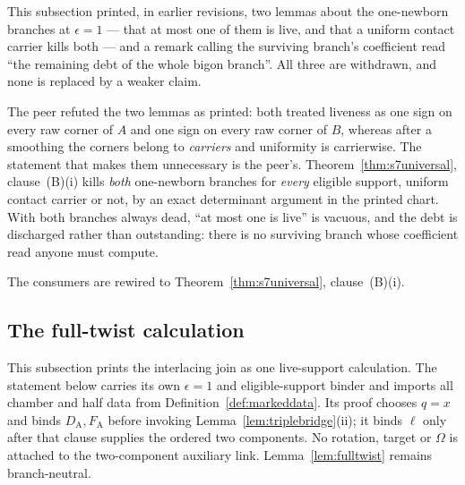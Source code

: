 \begin{remark}
\label{rem:excretired}
This subsection printed, in earlier revisions, two lemmas about the one-newborn
branches at $\epsilon=1$ --- that at most one of them is live, and that a
uniform contact carrier kills both --- and a remark calling the surviving
branch's coefficient read ``the remaining debt of the whole bigon branch''. All
three are withdrawn, and none is replaced by a weaker claim.

The peer refuted the two lemmas as printed: both treated liveness as one sign on
every raw corner of $A$ and one sign on every raw corner of $B$, whereas after a
smoothing the corners belong to \emph{carriers} and uniformity is carrierwise.
The statement that makes them unnecessary is the peer's.
Theorem~\ref{thm:s7universal}, clause~(B)(i) kills \emph{both} one-newborn branches for
\emph{every} eligible support, uniform contact carrier or not, by an exact
determinant argument in the printed chart. With both branches always dead,
``at most one is live'' is vacuous, and the debt is discharged rather than
outstanding: there is no surviving branch whose coefficient read anyone must
compute.

The consumers are rewired to Theorem~\ref{thm:s7universal}, clause~(B)(i).
\end{remark}

\subsection{The full-twist calculation}\label{sec:fulltwist}

This subsection prints the interlacing join as one live-support calculation.
The statement below carries its own $\epsilon=1$ and eligible-support binder and
imports all chamber and half data from Definition~\ref{def:markeddata}. Its
proof chooses $q=x$ and binds $D_{\mathrm A},F_{\mathrm A}$ before invoking
Lemma~\ref{lem:triplebridge}(ii); it binds $\ell$ only after that clause supplies
the ordered two components. No rotation, target or $\Omega$ is attached to the
two-component auxiliary link. Lemma~\ref{lem:fulltwist} remains branch-neutral.

